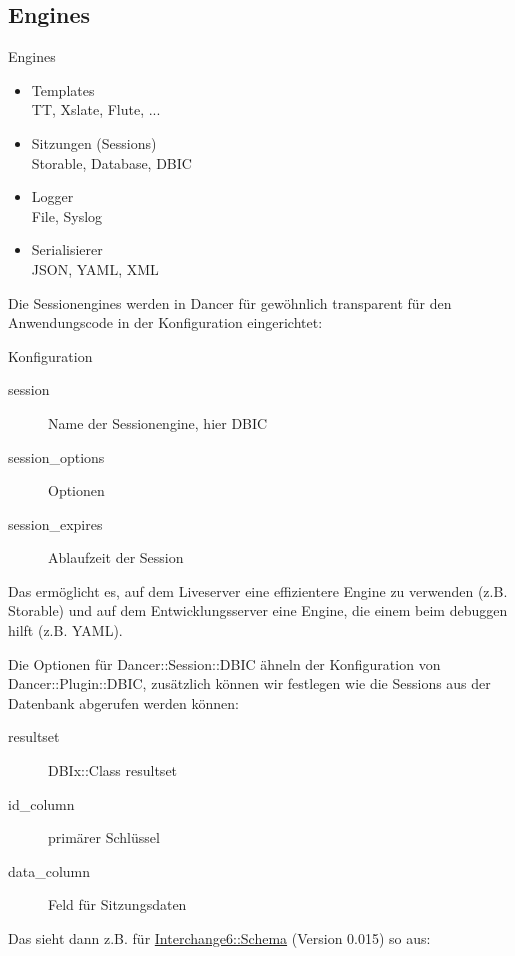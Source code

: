 \subsection{Engines}
\begin{frame}{Engines}
\begin{itemize}
\item Templates \\
TT, Xslate, Flute, ...
\item Sitzungen (Sessions) \\ 
Storable, Database, DBIC
\item Logger \\
File, Syslog
\item Serialisierer  \\
JSON, YAML, XML
\end{itemize}
\end{frame}

Die Sessionengines werden in Dancer für gewöhnlich transparent
für den Anwendungscode in der Konfiguration eingerichtet:

\begin{frame}{Konfiguration}
\begin{description}
\item[session] Name der Sessionengine, hier DBIC
\item[session\_options] Optionen
\item[session\_expires] Ablaufzeit der Session
\end{description}
\end{frame}

Das ermöglicht es, auf dem Liveserver eine effizientere Engine
zu verwenden (z.B. Storable) und auf dem Entwicklungsserver
eine Engine, die einem beim debuggen hilft (z.B. YAML).

Die Optionen für Dancer::Session::DBIC ähneln der Konfiguration von
Dancer::Plugin::DBIC, zusätzlich können wir festlegen wie
die Sessions aus der Datenbank abgerufen werden können:

\begin{description}
\item[resultset] DBIx::Class resultset
\item[id\_column] primärer Schlüssel
\item[data\_column] Feld für Sitzungsdaten 
\end{description}

Das sieht dann z.B. für \href{https://metacpan.org/pod/Interchange6::Schema}{Interchange6::Schema} (Version 0.015) so aus:


